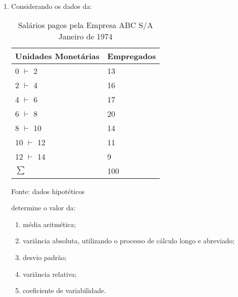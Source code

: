\begin{enumerate}
\item Considerando os dados da:
	\begin{table}[!htb]
	\centering
	\caption{Salários pagos pela Empresa ABC S/A  \\ Janeiro de 1974}
	\vspace{0.5cm}
	\begin{tabular}{ll}
	\hline 
	Unidades Monetárias  & Empregados \\
	\hline 
	0 $\vdash$ 2 & 13 \\
	2 $\vdash$ 4 & 16 \\
	4 $\vdash$ 6 & 17 \\
	6 $\vdash$ 8 & 20  \\
	8 $\vdash$ 10 & 14 \\
	10 $\vdash$ 12 & 11 \\
	12 $\vdash$ 14 & 9  \\ \hline 
	$\sum$ & 100  \\ \hline 
	\end{tabular}
	\newline Fonte: dados hipotéticos
	\end{table}
	determine o valor da:
	\begin{enumerate}
		\item média aritmética;
		\item variância absoluta, utilizando o processo de cálculo longo e abreviado;
		\item desvio padrão;
		\item variância relativa;
		\item coeficiente de variabilidade.
	\end{enumerate}
	

\end{enumerate}
